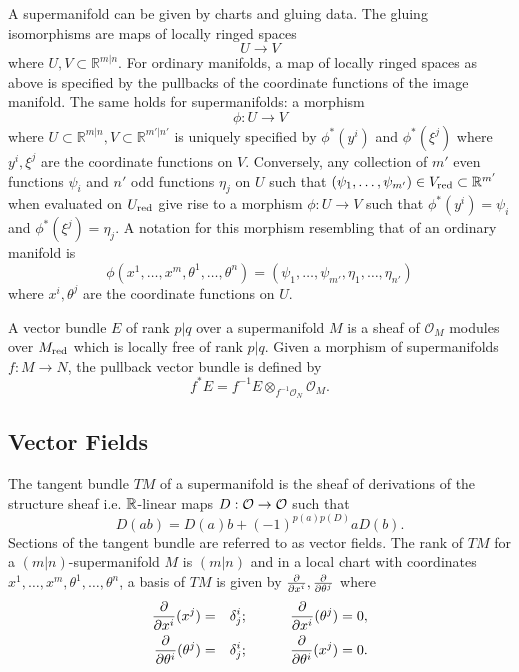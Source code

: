 \documentclass[11pt]{amsart}
\numberwithin{equation}{section}
\numberwithin{figure}{section}
\theoremstyle{plain}
\theoremstyle{definition}
\theoremstyle{remark}
\begin{document}
A supermanifold can be given by charts and gluing data. The gluing
isomorphisms are maps of locally ringed spaces
\[
U\rightarrow V
\]
where $U,V\subset\mathbb{R}^{m|n}$. For ordinary manifolds, a map
of locally ringed spaces as above is specified by the pullbacks of
the coordinate functions of the image manifold. The same holds for
supermanifolds: a morphism 
\[
\phi:U\rightarrow V
\]
where $U\subset\mathbb{R}^{m|n},V\subset\mathbb{R}^{m'|n'}$ is uniquely
specified by $\phi^{*}(y^{i})$ and $\phi^{*}(\xi^{j})$ where $y^{i},\xi^{j}$
are the coordinate functions on $V$. Conversely, any collection of
$m'$ even functions $\psi_{i}$ and $n'$ odd functions $\eta_{j}$
on $U$ such that $(\psi_{1},\dots,\psi_{m'})\in V_{\mathrm{red}}\subset\mathbb{R}^{m'}$
when evaluated on $U_{\mathrm{red}}$ give rise to a morphism $\phi:U\rightarrow V$
such that $\phi^{*}(y^{i})=\psi_{i}$ and $\phi^{*}(\xi^{j})=\eta_{j}$.
A notation for this morphism resembling that of an ordinary manifold
is 
\[
\phi(x^{1},\dots,x^{m},\theta^{1},\dots,\theta^{n})=(\psi_{1},\dots,\psi_{m'},\eta_{1},\dots,\eta_{n'})
\]
where $x^{i},\theta^{j}$ are the coordinate functions on $U$. 

A vector bundle $E$ of rank $p|q$ over a supermanifold $M$ is a
sheaf of $\mathcal{O}_{M}$ modules over $M_{\mathrm{red}}$ which is locally
free of rank $p|q$. Given a morphism of supermanifolds $f:M\rightarrow N$,
the pullback vector bundle is defined by 
\[
f^{*}E=f^{-1}E\otimes_{f^{-1}\mathcal{O}_{N}}\mathcal{O}_{M}.
\]



\subsection{Vector Fields}

The tangent bundle $TM$ of a supermanifold is the sheaf of derivations
of the structure sheaf i.e. $\mathbb{R}$-linear maps $D:\mathcal{O}\rightarrow\mathcal{O}$
such that 
\[
D(ab)=D(a)b+(-1)^{p(a)p(D)}aD(b).
\]
Sections of the tangent bundle are referred to as vector fields. The
rank of $TM$ for a $(m|n)$-supermanifold $M$ is $(m|n)$ and in
a local chart with coordinates $x^{1},\dots,x^{m},\theta^{1},\dots,\theta^{n}$,
a basis of $TM$ is given by $\frac{\partial}{\partial x^{i}},\frac{\partial}{\partial\theta^{j}}$ where 
\begin{eqnarray*}
\p{x^{i}}(x^{j}) & = & \delta_{j}^{i};\ \ \ \ \ \ \ \ \ \p{x^{i}}(\theta^{j})=0,\\
\p{\theta^{i}}(\theta^{j}) & = & \delta_{j}^{i};\ \ \ \ \ \ \ \ \ \p{\theta^{i}}(x^{j})=0.
\end{eqnarray*}
\end{document}
